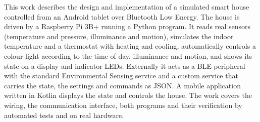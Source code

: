This work describes the design and implementation of a simulated smart house controlled from
an Android tablet over Bluetooth Low Energy. The house is driven by a Raspberry Pi 3B+ running
a Python program. It reads real sensors (temperature and pressure, illuminance and motion),
simulates the indoor temperature and a thermostat with heating and cooling, automatically
controls a colour light according to the time of day, illuminance and motion, and shows its
state on a display and indicator LEDs. Externally it acts as a BLE peripheral with the standard
Environmental Sensing service and a custom service that carries the state, the settings and
commands as JSON. A mobile application written in Kotlin displays the state and controls the
house. The work covers the wiring, the communication interface, both programs and their
verification by automated tests and on real hardware.
